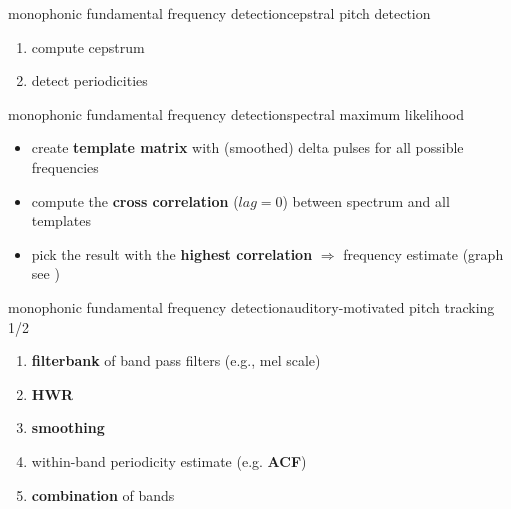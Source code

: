 	\begin{frame}{monophonic fundamental frequency detection}{cepstral pitch detection}
		\begin{enumerate}
			\item	compute cepstrum
			\item	detect periodicities
		\end{enumerate}
	\end{frame}
	
	\begin{frame}{monophonic fundamental frequency detection}{spectral maximum likelihood}
        \begin{itemize}
            \item   create \textbf{template matrix} with (smoothed) delta pulses for all possible frequencies
            
            \item<2->   compute the \textbf{cross correlation} ($lag=0$) between spectrum and all templates
            
            \item<3->   pick the result with the \textbf{highest correlation} $\Rightarrow$ frequency estimate (graph see )
        \end{itemize}
	\end{frame}
	
	\begin{frame}{monophonic fundamental frequency detection}{auditory-motivated pitch tracking 1/2}
		\begin{enumerate}
			\item	\textbf{filterbank} of band pass filters (e.g., mel scale)
			\item<2->	\textbf{HWR}
			\item<3->	\textbf{smoothing}
			\item<4->	within-band periodicity estimate (e.g. \textbf{ACF})
			\item<5->	\textbf{combination} of bands
		\end{enumerate}
	\end{frame}
	
